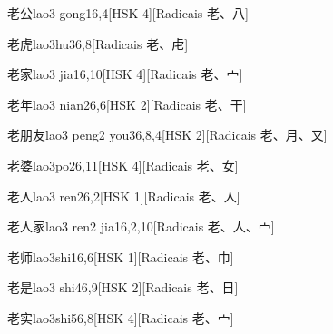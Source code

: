 \begin{entry}{老公}{lao3 gong1}{6,4}[HSK 4][Radicais ⽼、⼋]
\end{entry}

\begin{entry}{老虎}{lao3hu3}{6,8}[Radicais ⽼、⾌]
\end{entry}

\begin{entry}{老家}{lao3 jia1}{6,10}[HSK 4][Radicais ⽼、⼧]
\end{entry}

\begin{entry}{老年}{lao3 nian2}{6,6}[HSK 2][Radicais ⽼、⼲]
\end{entry}

\begin{entry}{老朋友}{lao3 peng2 you3}{6,8,4}[HSK 2][Radicais ⽼、⽉、⼜]
\end{entry}

\begin{entry}{老婆}{lao3po2}{6,11}[HSK 4][Radicais ⽼、⼥]
\end{entry}

\begin{entry}{老人}{lao3 ren2}{6,2}[HSK 1][Radicais ⽼、⼈]
\end{entry}

\begin{entry}{老人家}{lao3 ren2 jia1}{6,2,10}[Radicais ⽼、⼈、⼧]
\end{entry}

\begin{entry}{老师}{lao3shi1}{6,6}[HSK 1][Radicais ⽼、⼱]
\end{entry}

\begin{entry}{老是}{lao3 shi4}{6,9}[HSK 2][Radicais ⽼、⽇]
\end{entry}

\begin{entry}{老实}{lao3shi5}{6,8}[HSK 4][Radicais ⽼、⼧]
\end{entry}

